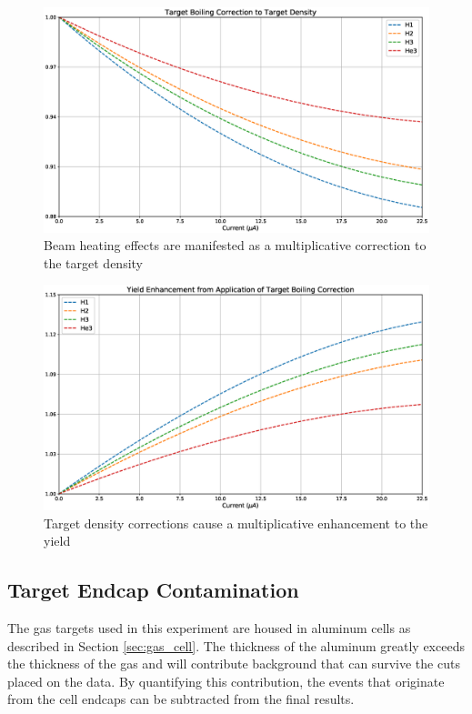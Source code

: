 \begin{figure}
	\includegraphics[width=\textwidth]{./analysis/fig/boil_cor.eps}
	\caption{Beam heating effects are manifested as a multiplicative correction to the target density}
	\label{fig:boilcor}
\end{figure}

\begin{figure}
	\includegraphics[width=\textwidth]{./analysis/fig/boil_yield_cor.eps}
	\caption{Target density corrections cause a multiplicative enhancement to the yield}
	\label{fig:boilyieldcor}
\end{figure}

\subsection{Target Endcap Contamination}
\label{sec:ecc}

The gas targets used in this experiment are housed in aluminum cells as described in Section \ref{sec:gas_cell}. The thickness of the aluminum greatly exceeds the thickness of the gas and will contribute background that can survive the cuts placed on the data. By quantifying this contribution, the events that originate from the cell endcaps can be subtracted from the final results.

